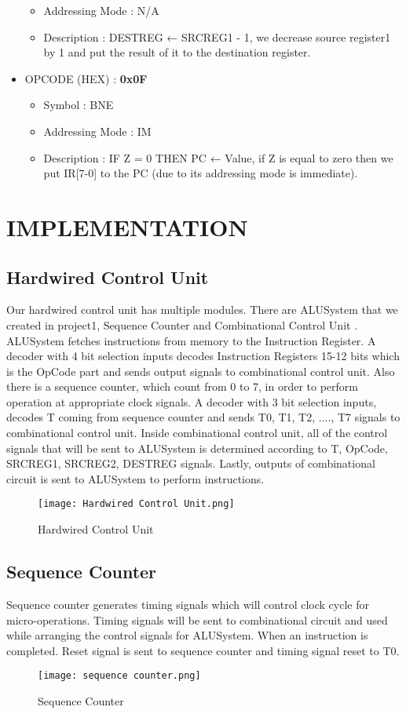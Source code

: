 \documentclass[pdftex,12pt,a4paper]{article}
\begin{document}
\begin{itemize}
\begin{itemize}
            \item Addressing Mode : N/A
            \item Description : DESTREG ← SRCREG1 - 1, we decrease source register1 by 1 and put the result of it to  the destination register.
        \end{itemize}    
    \item OPCODE (HEX) : \textbf{0x0F}
        \begin{itemize}
            \item Symbol : BNE
            \item Addressing Mode : IM
            \item Description : IF Z = 0 THEN PC ← Value, if Z is equal to zero then we put IR[7-0] to the PC (due to its addressing mode is immediate).
        \end{itemize}   
    \end{itemize}
    
\section{IMPLEMENTATION} 
\subsection{Hardwired Control Unit}
Our hardwired control unit has multiple modules. There are ALUSystem that we created in project1, Sequence Counter and Combinational Control Unit . ALUSystem fetches instructions from memory to the Instruction Register. A decoder with 4 bit selection inputs decodes Instruction Registers 15-12 bits which is the OpCode part and sends output signals to combinational control unit. Also there is a sequence counter, which count from 0 to 7, in order to perform operation at appropriate clock signals. A decoder with 3 bit selection inputs, decodes T coming from sequence counter and sends T0, T1, T2, ...., T7 signals to combinational control unit. Inside combinational control unit, all of the control signals that will be sent to ALUSystem is determined according to T, OpCode, SRCREG1, SRCREG2, DESTREG signals. Lastly, outputs of combinational circuit is sent to ALUSystem to perform instructions.
\begin{figure}[ht]
	\centering
	\texttt{[image: Hardwired Control Unit.png]}	
	\caption{Hardwired Control Unit}
	\label{fig1}
\end{figure}
\subsection{Sequence Counter}
Sequence counter generates timing signals which will control clock cycle for micro-operations. Timing signals will be sent to combinational circuit and used while arranging the control signals for ALUSystem. When an instruction is completed. Reset signal is sent to sequence counter and timing signal reset to T0.
\begin{figure}[ht]
	\centering
	\texttt{[image: sequence counter.png]}	
	\caption{Sequence Counter}
	\label{fig1}
\end{figure}
\end{document}
